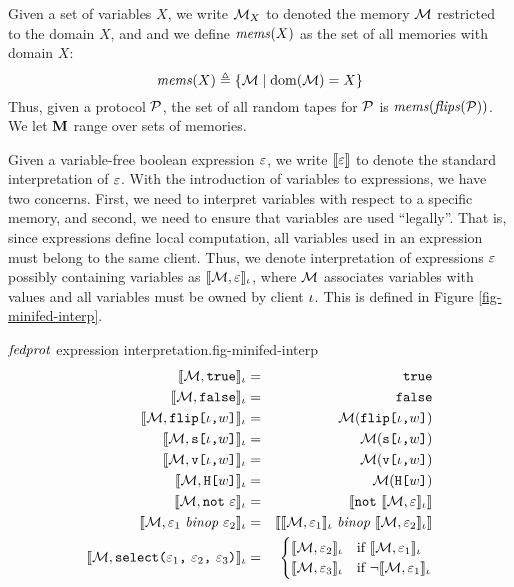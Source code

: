 Given a set of variables $X$, we write $\mathcal{M}_X$ to denoted the
memory $\mathcal{M}$ restricted to the domain $X$, and and we define
$\mathit{mems}(X)$ as the set of all memories with domain $X$:
$$
\mathit{mems}(X) \triangleq \{ \mathcal{M} \mid \mathrm{dom}(\mathcal{M}) = X \}
$$
Thus, given a protocol $\mathcal{P}$, the set of all random tapes for
$\mathcal{P}$ is $\mathit{mems}(\mathit{flips}(\mathcal{P}))$. We let $\mathbf{M}$ range
over sets of memories.

Given a variable-free boolean expression $\varepsilon$, we write $\llbracket \varepsilon \rrbracket$
to denote the standard interpretation of $\varepsilon$.  With the introduction
of variables to expressions, we have two concerns. First, we need to
interpret variables with respect to a specific memory, and second,
we need to ensure that variables are used ``legally''. That is, since
expressions define local computation, all variables used in an
expression must belong to the same client.  Thus, we denote
interpretation of expressions $\varepsilon$ possibly containing variables as
$\llbracket \mathcal{M},\varepsilon \rrbracket_{\iota}$, where $\mathcal{M}$ associates variables with
values and all variables must be owned by client $\iota$. This is
defined in Figure \ref{fig-minifed-interp}.

\begin{fpfig}[t]{$\mathit{fedprot}$ expression interpretation.}{fig-minifed-interp}
\begin{eqnarray*}
\lcod{\store, \etrue}{\cid} &=& \etrue\\
\lcod{\store, \efalse}{\cid} &=& \efalse\\
\lcod{\store, \flip{\cid}{w}}{\cid} &=& \store(\flip{\cid}{w})\\
\lcod{\store, \secret{\cid}{w}}{\cid} &=& \store(\secret{\cid}{w})\\
\lcod{\store, \view{\cid}{w}}{\cid} &=& \store(\view{\cid}{w})\\
\lcod{\store, \oracle{w}}{\cid} &=& \store(\oracle{w})\\
\lcod{\store, \enot\ \be}{\cid} &=& \cod{\enot\ \lcod{\store,\be}{\cid}}\\
\lcod{\store, \be_1\ \mathit{binop}\ \be_2}{\cid} &=&
    \cod{\lcod{\store,\be_1}{\cid}\ \mathit{binop}\ \lcod{\store,\be_2}{\cid}}\\
\lcod{\store, \select{\be_1}{\be_2}{\be_3}}{\cid} &=&
             \begin{cases}
                \lcod{\store,\be_2}{\cid} & \text{if\ } \lcod{\store,\be_1}{\cid}\\
                \lcod{\store,\be_3}{\cid} & \text{if\ } \neg\lcod{\store,\be_1}{\cid}
             \end{cases}%
\end{eqnarray*}
\end{fpfig}

